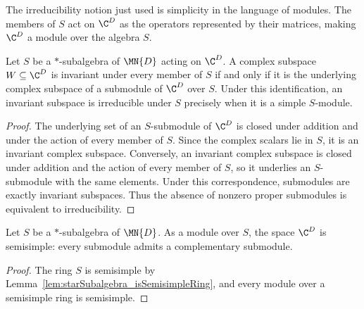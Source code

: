 The irreducibility notion just used is simplicity in the language of modules.
The members of $S$ act on $\C^D$ as the operators represented by their
matrices, making $\C^D$ a module over the algebra $S$.

\begin{lemma}%
    \label{lem:starSubalgebra_irreducible_iff_simple}
    \leanok
    Let $S$ be a $*$-subalgebra of $\MN{D}$ acting on $\C^D$. A complex
    subspace $W\subseteq\C^D$ is invariant under every member of $S$ if and
    only if it is the underlying complex subspace of a submodule of $\C^D$
    over $S$. Under this identification, an invariant subspace is
    irreducible under $S$ precisely when it is a simple $S$-module.
\end{lemma}

\begin{proof}
    \leanok
    The underlying set of an $S$-submodule of $\C^D$ is closed under
    addition and under the action of every member of $S$. Since the complex
    scalars lie in $S$, it is an invariant complex subspace. Conversely, an
    invariant complex subspace is closed under addition and the action of
    every member of $S$, so it underlies an $S$-submodule with the same
    elements. Under this correspondence, submodules are exactly invariant
    subspaces. Thus the absence of nonzero proper submodules is equivalent
    to irreducibility.
\end{proof}

\begin{lemma}%
    \label{lem:starSubalgebra_isSemisimpleModule}
    \leanok
    Let $S$ be a $*$-subalgebra of $\MN{D}$. As a module over $S$, the
    space $\C^D$ is semisimple: every submodule admits a complementary
    submodule.
\end{lemma}

\begin{proof}
    \leanok
    The ring $S$ is semisimple by
    Lemma~\ref{lem:starSubalgebra_isSemisimpleRing}, and every module over a
    semisimple ring is semisimple.
\end{proof}

